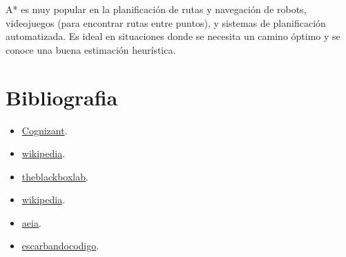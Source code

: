 \documentclass[12pt]{article}
\begin{document}
A* es muy popular en la planificación de rutas y navegación de robots, videojuegos (para encontrar rutas entre puntos), 
y sistemas de planificación automatizada. Es ideal en situaciones donde se necesita un camino óptimo y se conoce una buena estimación heurística.



\clearpage

\section{Bibliografia}
\begin{itemize}
    \item \href{https://www.cognizant.com/es/es/glossary/evolutionary-algorithm#:~:text=Un%20algoritmo%20evolutivo%20es%20una,la%20reproducci%C3%B3n%2C%20mutaci%C3%B3n%20y%20recombinaci%C3%B3n.}{Cognizant}.
    \item \href{https://es.wikipedia.org/wiki/Algoritmo_evolutivo}{wikipedia}.
    \item \href{https://theblackboxlab.com/2020/06/22/que-son-los-algoritmos-evolutivos-y-para-que-se-usan/}{theblackboxlab}.
    \item \href{https://es.wikipedia.org/wiki/Algoritmo_de_b%C3%BAsqueda_A*}{wikipedia}.
    \item \href{https://aeia.home.blog/algoritmo-a-estrellas-a/}{aeia}.
    \item \href{https://escarbandocodigo.wordpress.com/2011/07/11/1051/}{escarbandocodigo}.

\end{itemize}
\end{document}
